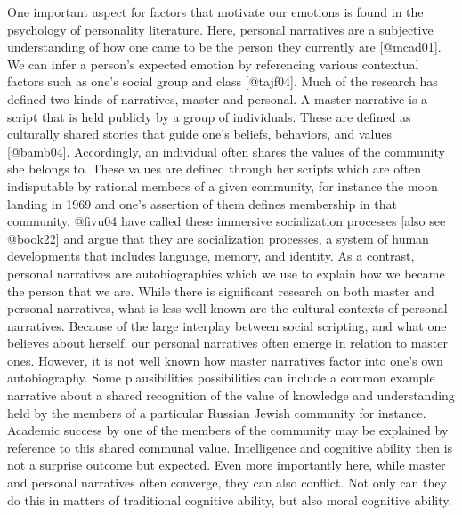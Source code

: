 \documentclass[
  letterpaper,
  DIV=11,
  numbers=noendperiod]{scrartcl}
\theoremstyle{remark}
\begin{document}
One important aspect for factors that motivate our emotions is found in
the psychology of personality literature. Here, personal narratives are
a subjective understanding of how one came to be the person they
currently are {[}@mcad01{]}. We can infer a person's expected emotion by
referencing various contextual factors such as one's social group and
class {[}@tajf04{]}. Much of the research has defined two kinds of
narratives, master and personal. A master narrative is a script that is
held publicly by a group of individuals. These are defined as culturally
shared stories that guide one's beliefs, behaviors, and values
{[}@bamb04{]}. Accordingly, an individual often shares the values of the
community she belongs to. These values are defined through her scripts
which are often indisputable by rational members of a given community,
for instance the moon landing in 1969 and one's assertion of them
defines membership in that community. @fivu04 have called these
immersive socialization processes {[}also see @book22{]} and argue that
they are socialization processes, a system of human developments that
includes language, memory, and identity. As a contrast, personal
narratives are autobiographies which we use to explain how we became the
person that we are. While there is significant research on both master
and personal narratives, what is less well known are the cultural
contexts of personal narratives. Because of the large interplay between
social scripting, and what one believes about herself, our personal
narratives often emerge in relation to master ones. However, it is not
well known how master narratives factor into one's own autobiography.
Some plausibilities possibilities can include a common example narrative
about a shared recognition of the value of knowledge and understanding
held by the members of a particular Russian Jewish community for
instance. Academic success by one of the members of the community may be
explained by reference to this shared communal value. Intelligence and
cognitive ability then is not a surprise outcome but expected. Even more
importantly here, while master and personal narratives often converge,
they can also conflict. Not only can they do this in matters of
traditional cognitive ability, but also moral cognitive ability.
\end{document}
